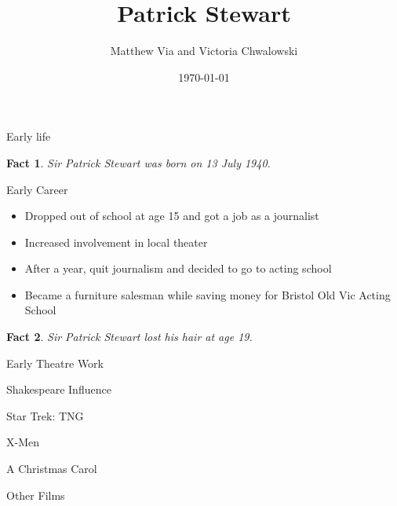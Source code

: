\documentclass[xcolor=dvipsnames]{beamer}
\begin{document}
\author{Matthew Via and Victoria Chwalowski}
\title{Patrick Stewart}
\date{\today}
\begin{frame}{}
\titlepage
\newtheorem{fct}{Fact}

\end{frame}
\begin{frame}{Early life}
  \begin{fct}
    Sir Patrick Stewart was born on 13 July 1940.
  \end{fct}
\end{frame}

\begin{frame}{Early Career}
  \begin{itemize}
    \item Dropped out of school at age 15 and got a job as a journalist
    \item Increased involvement in local theater
    \item After a year, quit journalism and decided to go to acting school
    \item Became a furniture salesman while saving money for Bristol Old Vic
    Acting School
  \end{itemize}
  \begin{fct}
    Sir Patrick Stewart lost his hair at age 19.
  \end{fct}
\end{frame}

\begin{frame}{Early Theatre Work}

\end{frame}

\begin{frame}{Shakespeare Influence}

\end{frame}

\begin{frame}{Star Trek: TNG}

\end{frame}

\begin{frame}{X-Men}

\end{frame}

\begin{frame}{A Christmas Carol}

\end{frame}

\begin{frame}{Other Films}

\end{frame}
\end{document}
